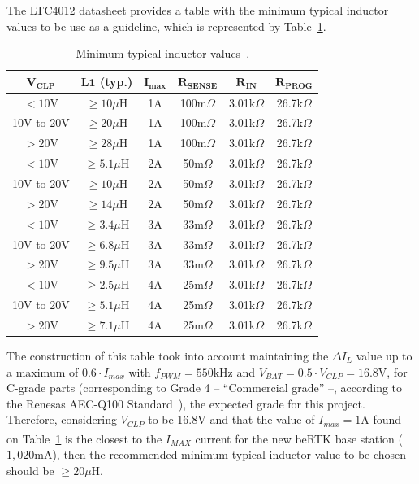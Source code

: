 The LTC4012 datasheet provides a table with the minimum typical inductor values to be use as a guideline, which is represented by Table~\ref{tab:typ_inductor_values}.
\begingroup
\begin{table}[h]
	\caption{Minimum typical inductor values~\cite{LTC4012}.}
	\label{tab:typ_inductor_values}
	\centering%
	\begin{tabular}{cccccc}
        \toprule
        $\mathbf{V_{CLP}}$ & $\mathbf{L1}$ (\textbf{typ.}) & $\mathbf{I_{max}}$ & $\mathbf{R_{SENSE}}$ & $\mathbf{R_{IN}}$ & $\mathbf{R_{PROG}}$\\
		\midrule
		$<10$V & $\geq 10 \mu$H & 1A & 100m$\Omega$ & 3.01k$\Omega$ & 26.7k$\Omega$ \\
        \midrule
		10V to 20V & $\geq 20 \mu$H & 1A & 100m$\Omega$ & 3.01k$\Omega$ & 26.7k$\Omega$ \\
        \midrule
		$>20$V & $\geq 28 \mu$H & 1A & 100m$\Omega$ & 3.01k$\Omega$ & 26.7k$\Omega$ \\
        \midrule
		$<10$V & $\geq 5.1 \mu$H & 2A & 50m$\Omega$ & 3.01k$\Omega$ & 26.7k$\Omega$ \\
        \midrule
		10V to 20V & $\geq 10 \mu$H & 2A & 50m$\Omega$ & 3.01k$\Omega$ & 26.7k$\Omega$ \\
        \midrule
		$>20$V & $\geq 14 \mu$H & 2A & 50m$\Omega$ & 3.01k$\Omega$ & 26.7k$\Omega$ \\
        \midrule
		$<10$V & $\geq 3.4 \mu$H & 3A & 33m$\Omega$ & 3.01k$\Omega$ & 26.7k$\Omega$ \\
        \midrule
		10V to 20V & $\geq 6.8 \mu$H & 3A & 33m$\Omega$ & 3.01k$\Omega$ & 26.7k$\Omega$ \\
        \midrule
		$>20$V & $\geq 9.5 \mu$H & 3A & 33m$\Omega$ & 3.01k$\Omega$ & 26.7k$\Omega$ \\
        \midrule
		$<10$V & $\geq 2.5 \mu$H & 4A & 25m$\Omega$ & 3.01k$\Omega$ & 26.7k$\Omega$ \\
        \midrule
		10V to 20V & $\geq 5.1 \mu$H & 4A & 25m$\Omega$ & 3.01k$\Omega$ & 26.7k$\Omega$ \\
        \midrule
		$>20$V & $\geq 7.1 \mu$H & 4A & 25m$\Omega$ & 3.01k$\Omega$ & 26.7k$\Omega$ \\
        \bottomrule
    \end{tabular}
\end{table}
\endgroup
The construction of this table took into account maintaining the $\Delta I_L$ value up to a maximum of $0.6 \cdot I_{max}$ with $f_{PWM}=550$kHz and $V_{BAT}=0.5 \cdot V_{CLP}=16.8$V, for C-grade parts (corresponding to Grade 4 -- ``Commercial grade'' --, according to the Renesas AEC-Q100 Standard~\cite{AEC-Q100}), the expected grade for this project. Therefore, considering $V_{CLP}$ to be 16.8V and that the value of $I_{max}=1$A found on Table~\ref{tab:typ_inductor_values} is the closest to the $I_{MAX}$ current for the new beRTK\textsuperscript{\textregistered} base station ($1,020$mA), then the recommended minimum typical inductor value to be chosen should be $\geq 20 \mu$H.
